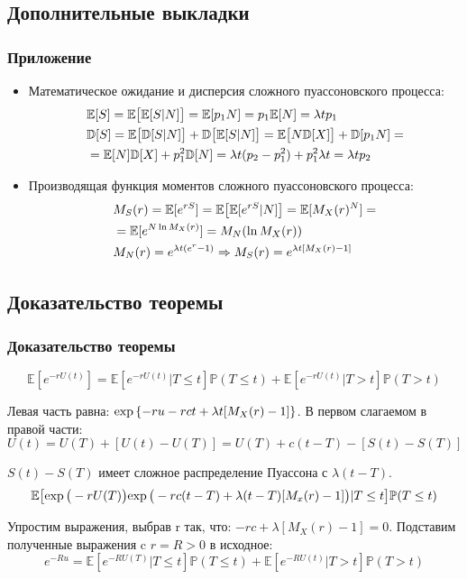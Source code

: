 \documentclass[10pt]{beamer}
\newcommand\Exp{{\rm exp \,}}
\newcommand\E{\mathbb{E}}
\newcommand\D{\mathbb{D}}
\newcommand\Pro{\mathbb{P}}
\begin{document}
\subsection{Дополнительные выкладки}
\begin{frame}
\frametitle{Приложение}
\begin{itemize}
    \item Математическое ожидание и дисперсия сложного пуассоновского процесса:
    \begin{align}
    & \E[S] = \E\big[\E[S|N]\big]=\E[p_1 N] = p_1\E[N] = \lambda t p_1 \\
    & \D[S] = \E\big[\D[S|N]\big] + \D\big[\E[S|N]\big] = \E\big[N\D[X]\big] + \D[p_1N] =\notag \\
    & = \E[N]\D[X] + p_1 ^2 \D[N] = \lambda t (p_2 - p_1^2) + p_1^2 \lambda t = \lambda t p_2
    \end{align}
    \item Производящая функция моментов сложного пуассоновского процесса:
    \begin{align}
    & M_S (r) = \mathbb{E}[e^{rS}]=\mathbb{E}\big[\mathbb{E}[e^{rS}|N]\big]=\mathbb{E}[M_X (r)^N]=\notag \\
    & = \mathbb{E}[e^{N \ln{M_X (r)}}]= M_N (\ln{M_X (r)}) \\
    & M_N (r) = e^{\lambda t(e^r - 1)} \Rightarrow M_S (r) = e^{\lambda t[M_X (r) - 1]}
    \end{align}
\end{itemize}
\end{frame}


\subsection{Доказательство теоремы}
\begin{frame}
\frametitle{Доказательство теоремы}
\begin{equation}
\E[e^{-rU(t)}] = \E[e^{-rU(t)}|T \leq t]\Pro(T \leq t) + \E[e^{-rU(t)}|T > t]\Pro(T > t)
\end{equation}

\noindent
Левая часть равна: $\Exp\{-ru - rct + \lambda t [M_X(r) - 1]\}$.
В первом слагаемом в правой части:
\begin{equation}
U(t) = U(T) + [U(t) - U(T)] =  U(T) + c(t - T) - [S(t) - S(T)]
\end{equation}

\noindent
$S(t) - S(T)$ имеет сложное распределение Пуассона с $\lambda (t -T)$.
\begin{equation}
\E\big[\Exp\big(-rU(T)\big)\Exp\big(-rc(t-T) + \lambda (t - T)[M_x(r) - 1]\big)|T \leq t\big] 
\Pro (T \leq t)
\end{equation}

\noindent
Упростим выражения, выбрав r так, что: $-rc + \lambda [M_X(r) - 1] = 0$.
Подставим полученные выражения c $r = R > 0$ в исходное:
\begin{equation}
e^{-Ru} = \E[e^{-RU(T)}|T \leq t]\Pro(T \leq t) + \E[e^{-RU(t)}|T > t]\Pro(T > t)
\end{equation}
\end{frame}
\end{document}
